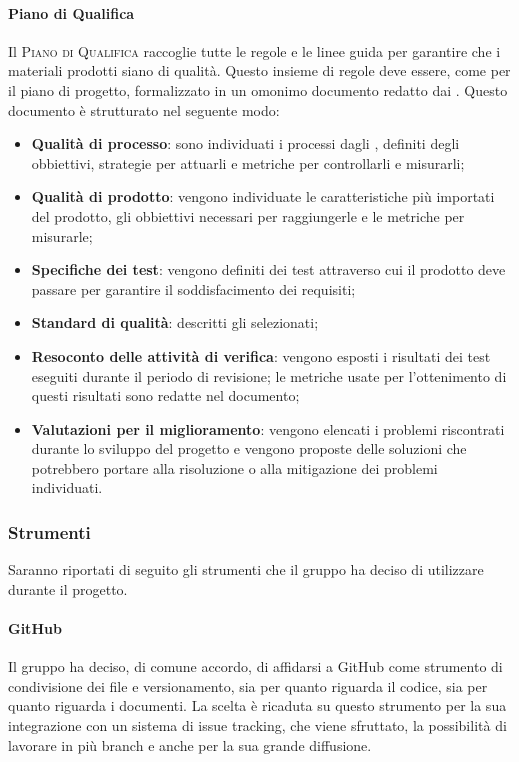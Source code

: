 \documentclass[../norme_di_progetto.tex]{subfiles}
\begin{document}
\paragraph{Piano di Qualifica}
Il \textsc{Piano di Qualifica} raccoglie tutte le regole e le linee guida per garantire che i materiali prodotti siano di qualità. Questo insieme di regole deve essere, come per il piano di progetto, formalizzato in un omonimo documento redatto dai .
Questo documento è strutturato nel seguente modo:
\begin{itemize}
    \item \textbf{Qualità di processo}: sono individuati i processi dagli , definiti degli obbiettivi, strategie per attuarli e metriche per controllarli e misurarli;
    \item \textbf{Qualità di prodotto}: vengono individuate le caratteristiche più importati del prodotto, gli obbiettivi necessari per raggiungerle e le metriche per misurarle;
    \item \textbf{Specifiche dei test}: vengono definiti dei test attraverso cui il prodotto deve passare per garantire il soddisfacimento dei requisiti;
    \item \textbf{Standard di qualità}: descritti gli  selezionati;
    \item \textbf{Resoconto delle attività di verifica}: vengono esposti i risultati dei test eseguiti durante il periodo di revisione; le metriche usate per l'ottenimento di questi risultati sono redatte nel documento;
    \item \textbf{Valutazioni per il miglioramento}: vengono elencati i problemi riscontrati durante lo sviluppo del progetto e vengono proposte delle soluzioni che potrebbero portare alla risoluzione o alla mitigazione dei problemi individuati.
\end{itemize} 

\subsubsection{Strumenti}
Saranno riportati di seguito gli strumenti che il gruppo ha deciso di utilizzare durante il progetto.

\paragraph{GitHub}
Il gruppo ha deciso, di comune accordo, di affidarsi a GitHub come strumento di condivisione dei file e versionamento, sia per quanto riguarda il codice, sia per quanto riguarda i documenti. La scelta è ricaduta su questo strumento per la sua integrazione con un sistema di issue tracking, che viene sfruttato, la possibilità di lavorare in più branch e anche per la sua grande diffusione.
\end{document}
